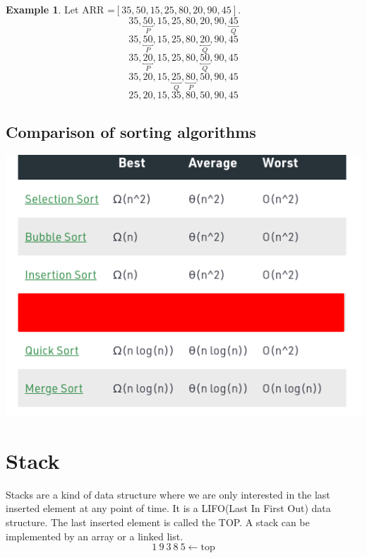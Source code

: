 \documentclass[10pt, a4paper]{extarticle}
\theoremstyle{definition}
\newtheorem{eg}{Example}
\begin{document}
	\begin{eg}
		Let ARR =$[35,50,15,25,80,20,90,45]$.
		\[\boxed{35},\underbracket{50}_P,15,25,80,20,90,\underbracket{45}_Q\]
		\[\boxed{35},\underbracket{50}_P,15,25,80,\underbracket{20}_Q,90,45\]
		\[\boxed{35},\underbracket{20}_P,15,25,80,\underbracket{50}_Q,90,45\]
		\[\boxed{35},20,15,\underbracket{25}_Q,\underbracket{80}_P,50,90,45\]
		\[25,20,15,\boxed{35},80,50,90,45\]
	\end{eg}

	\subsection{Comparison of sorting algorithms}
		\begin{center}
			\includegraphics[scale=0.7]{sort.png}\\
		\end{center}


	\section{Stack}
	Stacks are a kind of data structure where we are only interested in the last inserted element at any point of time. It is a LIFO(Last In First Out) data structure. The last inserted element is called the TOP. A stack can be implemented by an array or a linked list.
	\[1\ 9\ 3\ 8\ 5\leftarrow\boxed{\text{top}}\]
\end{document}
